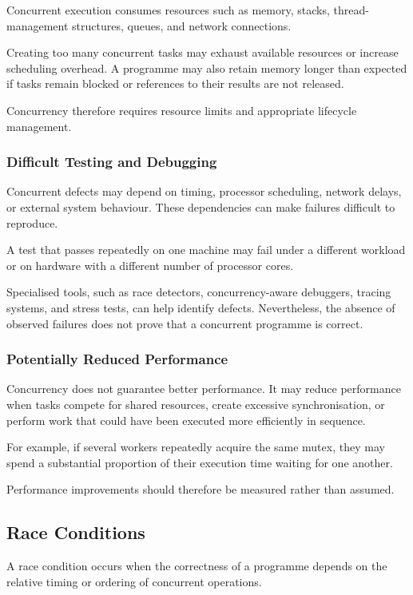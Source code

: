 Concurrent execution consumes resources such as memory, stacks, thread-management structures, queues, and network connections.

Creating too many concurrent tasks may exhaust available resources or increase scheduling overhead. A programme may also retain memory longer than expected if tasks remain blocked or references to their results are not released.

Concurrency therefore requires resource limits and appropriate lifecycle management.

\subsubsection{Difficult Testing and Debugging}

Concurrent defects may depend on timing, processor scheduling, network delays, or external system behaviour. These dependencies can make failures difficult to reproduce.

A test that passes repeatedly on one machine may fail under a different workload or on hardware with a different number of processor cores.

Specialised tools, such as race detectors, concurrency-aware debuggers, tracing systems, and stress tests, can help identify defects. Nevertheless, the absence of observed failures does not prove that a concurrent programme is correct.

\subsubsection{Potentially Reduced Performance}

Concurrency does not guarantee better performance. It may reduce performance when tasks compete for shared resources, create excessive synchronisation, or perform work that could have been executed more efficiently in sequence.

For example, if several workers repeatedly acquire the same mutex, they may spend a substantial proportion of their execution time waiting for one another.

Performance improvements should therefore be measured rather than assumed.

\subsection{Race Conditions}

A race condition occurs when the correctness of a programme depends on the relative timing or ordering of concurrent operations.

